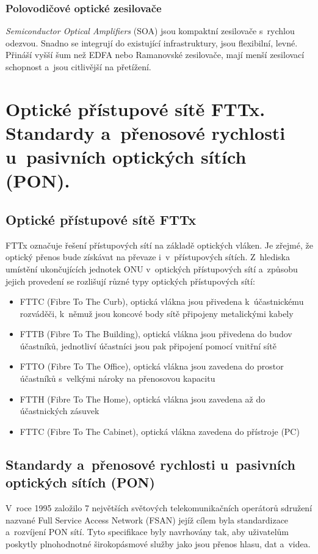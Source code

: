 \subsubsection{Polovodičové optické zesilovače}

\emph{Semiconductor Optical Amplifiers} (SOA) jsou kompaktní zesilovače s~rychlou odezvou. Snadno se integrují do existující infrastruktury, jsou flexibilní, levné. Přináší vyšší šum než EDFA nebo Ramanovské zesilovače, mají menší zesilovací schopnost a~jsou citlivější na přetížení.


\clearpage
\section{Optické přístupové sítě FTTx. Standardy a~přenosové rychlosti u~pasivních optických sítích (PON).}

\subsection{Optické přístupové sítě FTTx}
FTTx označuje řešení přístupových sítí na základě optických vláken. Je zřejmé, že optický přenos bude získávat na převaze i~v~přístupových sítích. Z~hlediska umístění ukončujících jednotek ONU v~optických přístupových sítí a~způsobu jejich provedení se rozlišují různé typy optických přístupových sítí:
\begin{itemize}
  \item FTTC (Fibre To The Curb), optická vlákna jsou přivedena k~účastnickému rozváděči, k~němuž jsou koncové body sítě připojeny metalickými kabely
  \item FTTB (Fibre To The Building), optická vlákna jsou přivedena do budov účastníků, jednotliví účastníci jsou pak připojení pomocí vnitřní sítě
  \item FTTO (Fibre To The Office), optická vlákna jsou zavedena do prostor účastníků s~velkými nároky na přenosovou kapacitu
  \item FTTH (Fibre To The Home), optická vlákna jsou zavedena až do účastnických zásuvek
  \item FTTC (Fibre To The Cabinet), optická vlákna zavedena do přístroje (PC)
\end{itemize}

\subsection{Standardy a~přenosové rychlosti u~pasivních optických sítích (PON)}
V~roce 1995 založilo 7 největších světových telekomunikačních operátorů sdružení nazvané Full Service Access Network (FSAN) jejíž cílem byla standardizace a~rozvíjení PON sítí. Tyto specifikace byly navrhovány tak, aby uživatelům poskytly plnohodnotné širokopásmové služby jako jsou přenos hlasu, dat a~videa.

